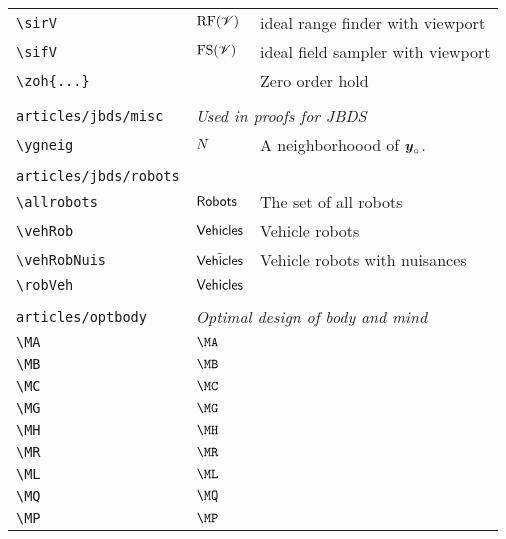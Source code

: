 \begin{longtable}{lll}
 {\color[rgb]{0.5,0.5,0.5}\texttt{\textbackslash sirV}} & $\text{RF}(\mathscr{V})$ &  ideal range finder with viewport\\ 
 {\color[rgb]{0.5,0.5,0.5}\texttt{\textbackslash sifV}} & $\text{FS}(\mathscr{V})$ &  ideal field sampler with viewport\\ 
 {\color[rgb]{0.5,0.5,0.5}\texttt{\textbackslash zoh\{...\}}} &  &  Zero order hold\\ 
  &  & \\ 
 {\color[rgb]{0.5,0.5,0.5}\texttt{articles/jbds/misc}} & \multicolumn{2}{l}{\emph{Used in proofs for JBDS}}\\ 
 \hline
{\color[rgb]{0.5,0.5,0.5}\texttt{\textbackslash ygneig}} & $N$ &  A neighborhoood of $\boldsymbol{y}_{\circ}$.\\ 
  &  & \\ 
 {\color[rgb]{0.5,0.5,0.5}\texttt{articles/jbds/robots}} & \multicolumn{2}{l}{\emph{}}\\ 
 \hline
{\color[rgb]{0.5,0.5,0.5}\texttt{\textbackslash allrobots}} & $\mathsf{Robots}$ &  The set of all robots\\ 
 {\color[rgb]{0.5,0.5,0.5}\texttt{\textbackslash vehRob}} & $\mathsf{Vehicles}$ &  Vehicle robots\\ 
 {\color[rgb]{0.5,0.5,0.5}\texttt{\textbackslash vehRobNuis}} & ${\tilde{\mathsf{Vehicles}}}$ &  Vehicle robots with nuisances\\ 
 {\color[rgb]{0.5,0.5,0.5}\texttt{\textbackslash robVeh}} & $\mathsf{Vehicles}$ & \\ 
  &  & \\ 
 {\color[rgb]{0.5,0.5,0.5}\texttt{articles/optbody}} & \multicolumn{2}{l}{\emph{Optimal design of body and mind}}\\ 
 \hline
{\color[rgb]{0.5,0.5,0.5}\texttt{\textbackslash MA}} & $\MA$ & \\ 
 {\color[rgb]{0.5,0.5,0.5}\texttt{\textbackslash MB}} & $\MB$ & \\ 
 {\color[rgb]{0.5,0.5,0.5}\texttt{\textbackslash MC}} & $\MC$ & \\ 
 {\color[rgb]{0.5,0.5,0.5}\texttt{\textbackslash MG}} & $\MG$ & \\ 
 {\color[rgb]{0.5,0.5,0.5}\texttt{\textbackslash MH}} & $\MH$ & \\ 
 {\color[rgb]{0.5,0.5,0.5}\texttt{\textbackslash MR}} & $\MR$ & \\ 
 {\color[rgb]{0.5,0.5,0.5}\texttt{\textbackslash ML}} & $\ML$ & \\ 
 {\color[rgb]{0.5,0.5,0.5}\texttt{\textbackslash MQ}} & $\MQ$ & \\ 
 {\color[rgb]{0.5,0.5,0.5}\texttt{\textbackslash MP}} & $\MP$ & \\ 

\end{longtable}
